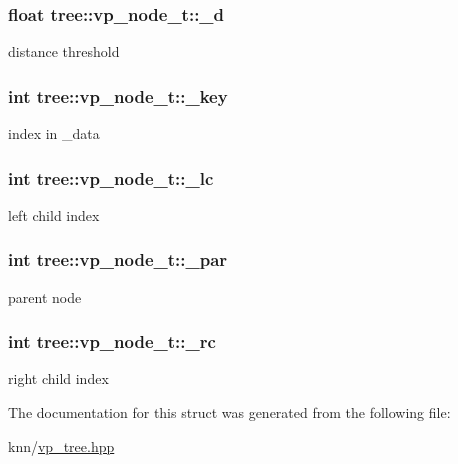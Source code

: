 \subsubsection[{\+\_\+d}]{\setlength{\rightskip}{0pt plus 5cm}float tree\+::vp\+\_\+node\+\_\+t\+::\+\_\+d}\label{structtree_1_1vp__node__t_a2a72786ef681fb55e7cc9f1a91a637f5}
distance threshold \hypertarget{structtree_1_1vp__node__t_afb86b117e74d2591551388b2f62d3197}{}
\subsubsection[{\+\_\+key}]{\setlength{\rightskip}{0pt plus 5cm}int tree\+::vp\+\_\+node\+\_\+t\+::\+\_\+key}\label{structtree_1_1vp__node__t_afb86b117e74d2591551388b2f62d3197}
index in \+\_\+data \hypertarget{structtree_1_1vp__node__t_a36ac11ce1caaf5d34aab924ee27158f4}{}
\subsubsection[{\+\_\+lc}]{\setlength{\rightskip}{0pt plus 5cm}int tree\+::vp\+\_\+node\+\_\+t\+::\+\_\+lc}\label{structtree_1_1vp__node__t_a36ac11ce1caaf5d34aab924ee27158f4}
left child index \hypertarget{structtree_1_1vp__node__t_adaed604524e1fac9424ad51e2b0c4484}{}
\subsubsection[{\+\_\+par}]{\setlength{\rightskip}{0pt plus 5cm}int tree\+::vp\+\_\+node\+\_\+t\+::\+\_\+par}\label{structtree_1_1vp__node__t_adaed604524e1fac9424ad51e2b0c4484}
parent node \hypertarget{structtree_1_1vp__node__t_a733a0e18db87b13307818a3bbec8e154}{}
\subsubsection[{\+\_\+rc}]{\setlength{\rightskip}{0pt plus 5cm}int tree\+::vp\+\_\+node\+\_\+t\+::\+\_\+rc}\label{structtree_1_1vp__node__t_a733a0e18db87b13307818a3bbec8e154}
right child index 

The documentation for this struct was generated from the following file\+:\begin{DoxyCompactItemize}
\item 
knn/\hyperlink{vp__tree_8hpp}{vp\+\_\+tree.\+hpp}\end{DoxyCompactItemize}
